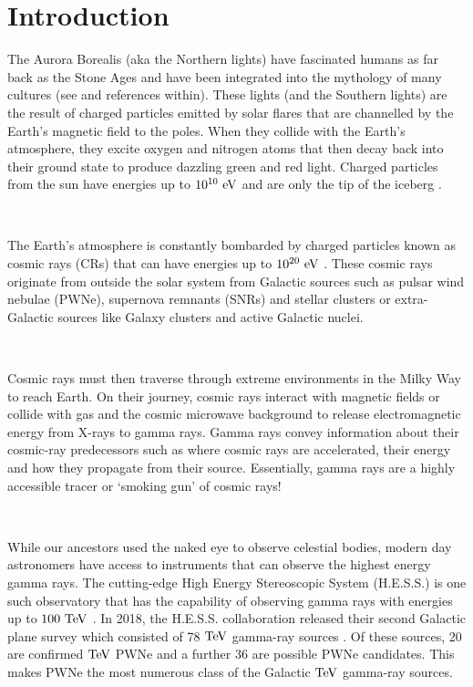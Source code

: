 \chapter{Introduction}

The Aurora Borealis (aka the Northern lights) have fascinated humans as far back as the Stone Ages and have been integrated into the mythology of many cultures (see \cite{1980mlas.book.....E} and references within). These lights (and the Southern lights) are the result of charged particles emitted by solar flares that are channelled by the Earth's magnetic field to the poles. When they collide with the Earth's atmosphere, they excite oxygen and nitrogen atoms that then decay back into their ground state to produce dazzling green and red light. Charged particles from the sun have energies up to $10^{10}~\si{\electronvolt}$ and are only the tip of the iceberg \citep{2011hea..book.....L}. 
\par~\par
The Earth's atmosphere is constantly bombarded by charged particles known as cosmic rays (CRs) that can have energies up to $10^{20}~\si{\electronvolt}$ \citep{alma9924446790001811}. These cosmic rays originate from outside the solar system from Galactic sources such as pulsar wind nebulae (PWNe), supernova remnants (SNRs) and stellar clusters or extra-Galactic sources like Galaxy clusters and active Galactic nuclei.
\par~\par
Cosmic rays must then traverse through extreme environments in the Milky Way to reach Earth. On their journey, cosmic rays interact with magnetic fields or collide with gas and the cosmic microwave background to release electromagnetic energy from X-rays to gamma rays. Gamma rays convey information about their cosmic-ray predecessors such as where cosmic rays are accelerated, their energy and how they propagate from their source. Essentially, gamma rays are a highly accessible tracer or `smoking gun' of cosmic rays! 
\par~\par 
While our ancestors used the naked eye to observe celestial bodies, modern day astronomers have access to instruments that can observe the highest energy gamma rays. The cutting-edge High Energy Stereoscopic System (H.E.S.S.) is one such observatory that has the capability of observing gamma rays with energies up to $100~\TeV$ \citep{HESS}. In 2018, the H.E.S.S. collaboration released their second Galactic plane survey which consisted of 78 $\TeV$ gamma-ray sources \citep{2018A&A...612A...1H}. Of these sources, 20 are confirmed $\TeV$ PWNe and a further 36 are possible PWNe candidates. This makes PWNe the most numerous class of the Galactic $\TeV$ gamma-ray sources.
